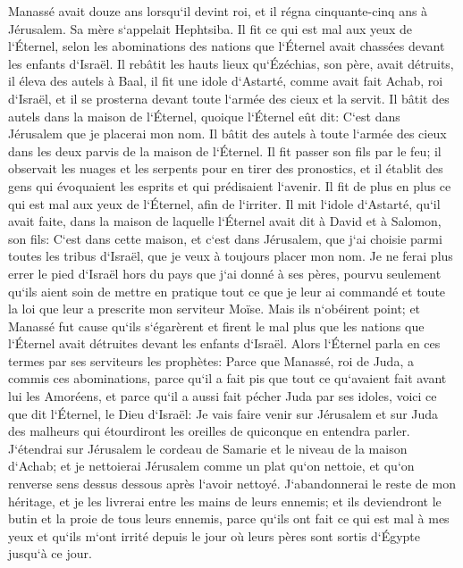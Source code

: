 \verse Manassé avait douze ans lorsqu`il devint roi, et il régna cinquante-cinq ans à Jérusalem. Sa mère s`appelait Hephtsiba. 
\verse Il fit ce qui est mal aux yeux de l`Éternel, selon les abominations des nations que l`Éternel avait chassées devant les enfants d`Israël. 
\verse Il rebâtit les hauts lieux qu`Ézéchias, son père, avait détruits, il éleva des autels à Baal, il fit une idole d`Astarté, comme avait fait Achab, roi d`Israël, et il se prosterna devant toute l`armée des cieux et la servit. 
\verse Il bâtit des autels dans la maison de l`Éternel, quoique l`Éternel eût dit: C`est dans Jérusalem que je placerai mon nom. 
\verse Il bâtit des autels à toute l`armée des cieux dans les deux parvis de la maison de l`Éternel. 
\verse Il fit passer son fils par le feu; il observait les nuages et les serpents pour en tirer des pronostics, et il établit des gens qui évoquaient les esprits et qui prédisaient l`avenir. Il fit de plus en plus ce qui est mal aux yeux de l`Éternel, afin de l`irriter. 
\verse Il mit l`idole d`Astarté, qu`il avait faite, dans la maison de laquelle l`Éternel avait dit à David et à Salomon, son fils: C`est dans cette maison, et c`est dans Jérusalem, que j`ai choisie parmi toutes les tribus d`Israël, que je veux à toujours placer mon nom. 
\verse Je ne ferai plus errer le pied d`Israël hors du pays que j`ai donné à ses pères, pourvu seulement qu`ils aient soin de mettre en pratique tout ce que je leur ai commandé et toute la loi que leur a prescrite mon serviteur Moïse. 
\verse Mais ils n`obéirent point; et Manassé fut cause qu`ils s`égarèrent et firent le mal plus que les nations que l`Éternel avait détruites devant les enfants d`Israël. 
\verse Alors l`Éternel parla en ces termes par ses serviteurs les prophètes: 
\verse Parce que Manassé, roi de Juda, a commis ces abominations, parce qu`il a fait pis que tout ce qu`avaient fait avant lui les Amoréens, et parce qu`il a aussi fait pécher Juda par ses idoles, 
\verse voici ce que dit l`Éternel, le Dieu d`Israël: Je vais faire venir sur Jérusalem et sur Juda des malheurs qui étourdiront les oreilles de quiconque en entendra parler. 
\verse J`étendrai sur Jérusalem le cordeau de Samarie et le niveau de la maison d`Achab; et je nettoierai Jérusalem comme un plat qu`on nettoie, et qu`on renverse sens dessus dessous après l`avoir nettoyé. 
\verse J`abandonnerai le reste de mon héritage, et je les livrerai entre les mains de leurs ennemis; et ils deviendront le butin et la proie de tous leurs ennemis, 
\verse parce qu`ils ont fait ce qui est mal à mes yeux et qu`ils m`ont irrité depuis le jour où leurs pères sont sortis d`Égypte jusqu`à ce jour. 
